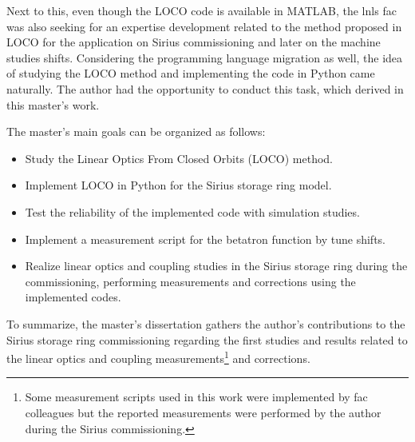 Next to this, even though the LOCO code is available in MATLAB, the \gls{lnls} \gls{fac} was also seeking for an expertise development related to the method proposed in LOCO for the application on Sirius commissioning and later on the machine studies shifts. Considering the programming language migration as well, the idea of studying the LOCO method and implementing the code in Python came naturally. The author had the opportunity to conduct this task, which derived in this master's work. 

The master's main goals can be organized as follows:
\begin{itemize}
    \item Study the Linear Optics From Closed Orbits (LOCO) method.
    \item Implement LOCO in Python for the Sirius storage ring model.
    \item Test the reliability of the implemented code with simulation studies.
    \item Implement a measurement script for the betatron function by tune shifts.
    \item Realize linear optics and coupling studies in the Sirius storage ring during the commissioning, performing measurements and corrections using the implemented codes.
\end{itemize}

To summarize, the master's dissertation gathers the author's contributions to the Sirius storage ring commissioning regarding the first studies and results related to the linear optics and coupling measurements\footnote{Some measurement scripts used in this work were implemented by \gls{fac} colleagues but the reported measurements were performed by the author during the Sirius commissioning.} and corrections. 










